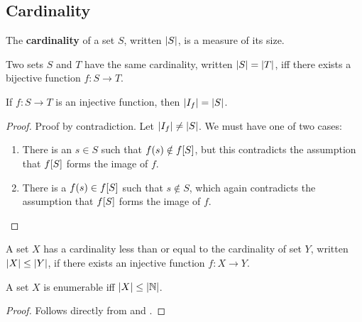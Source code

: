 \subsection{Cardinality}

\begin{notion} The \textbf{cardinality} of a set $S$, written $\mathopen{}\left|{S}\right|\mathclose{}$, is a
measure of its size. \end{notion}

\begin{definition} \label{def:same-card} Two sets $S$ and $T$ have the same
cardinality, written $\mathopen{}\left|{S}\right|\mathclose{}=\mathopen{}\left|{T}\right|\mathclose{}$, iff there exists a bijective function
$f : S\rightarrow T$.\end{definition}

\begin{theorem} \label{thm:injective-image-card} If $f : S \rightarrow T$ is an
injective function, then $\mathopen{}\left|{I_f}\right|\mathclose{}=\mathopen{}\left|{S}\right|\mathclose{}$. \end{theorem}

\begin{proof} Proof by contradiction. Let $\mathopen{}\left|{I_f}\right|\mathclose{} \neq \mathopen{}\left|{S}\right|\mathclose{}$. We
must have one of two cases: 

\begin{enumerate}

\item There is an $s\in S$ such that $f\mathopen{}\left({s}\right)\mathclose{}\notin f\mathopen{}\left[{S}\right]\mathclose{}$, but this
contradicts the assumption that $f\mathopen{}\left[{S}\right]\mathclose{}$ forms the image of $f$.

\item There is a $f\mathopen{}\left({s}\right)\mathclose{}\in f\mathopen{}\left[{S}\right]\mathclose{}$ such that $s\notin S$, which again
contradicts the assumption that $f\mathopen{}\left[{S}\right]\mathclose{}$ forms the image of $f$. 

\end{enumerate}

\end{proof}

\begin{definition} \label{def:card-leq} A set $X$ has a cardinality less than
or equal to the cardinality of set $Y$, written $\mathopen{}\left|{X}\right|\mathclose{}\leq\mathopen{}\left|{Y}\right|\mathclose{}$, if
there exists an injective function $f:X\rightarrow Y$. \end{definition}

\begin{theorem}\label{thm:card-enumerable} A set $X$ is enumerable iff
$\mathopen{}\left|{X}\right|\mathclose{}\leq\mathopen{}\left|{\mathbb{N}}\right|\mathclose{}$.  \end{theorem}

\begin{proof} Follows directly from  and .
\end{proof}



